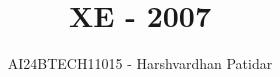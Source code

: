 \documentclass[journal]{IEEEtran}
\begin{document}

\vspace{3cm}

\title{XE - 2007}
\author{AI24BTECH11015 - Harshvardhan Patidar}
 \maketitle
{\let\newpage\relax\maketitle}

\renewcommand{\thefigure}{\theenumi}
\renewcommand{\thetable}{\theenumi}
\setlength{\intextsep}{10pt} %


\renewcommand{\thetable}{\theenumi}
\end{document}
